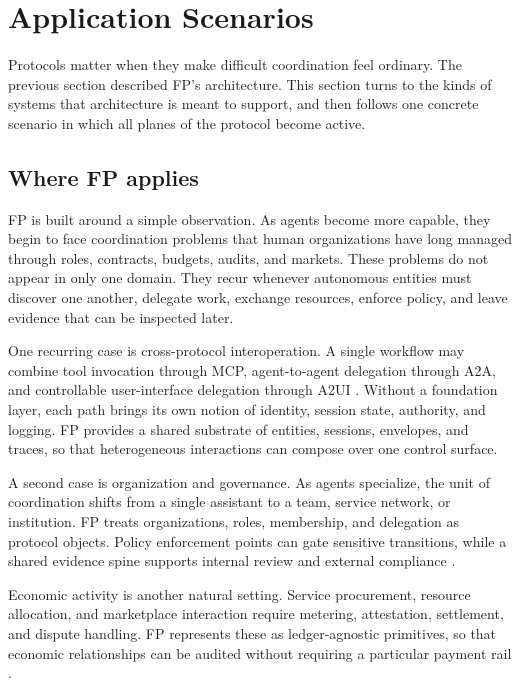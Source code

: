 \section{Application Scenarios}
\label{sec:scenarios}

Protocols matter when they make difficult coordination feel ordinary. The previous section described FP's architecture. This section turns to the kinds of systems that architecture is meant to support, and then follows one concrete scenario in which all planes of the protocol become active.

\subsection{Where FP applies}
\label{subsec:scenario-overview}

FP is built around a simple observation. As agents become more capable, they begin to face coordination problems that human organizations have long managed through roles, contracts, budgets, audits, and markets. These problems do not appear in only one domain. They recur whenever autonomous entities must discover one another, delegate work, exchange resources, enforce policy, and leave evidence that can be inspected later.

One recurring case is cross-protocol interoperation. A single workflow may combine tool invocation through MCP, agent-to-agent delegation through A2A, and controllable user-interface delegation through A2UI \cite{mcp_spec,a2a_spec,a2ui_spec}. Without a foundation layer, each path brings its own notion of identity, session state, authority, and logging. FP provides a shared substrate of entities, sessions, envelopes, and traces, so that heterogeneous interactions can compose over one control surface.

A second case is organization and governance. As agents specialize, the unit of coordination shifts from a single assistant to a team, service network, or institution. FP treats organizations, roles, membership, and delegation as protocol objects. Policy enforcement points can gate sensitive transitions, while a shared evidence spine supports internal review and external compliance \cite{agi_economics,virtual_agent_economies}.

Economic activity is another natural setting. Service procurement, resource allocation, and marketplace interaction require metering, attestation, settlement, and dispute handling. FP represents these as ledger-agnostic primitives, so that economic relationships can be audited without requiring a particular payment rail \cite{ucp_spec}.


